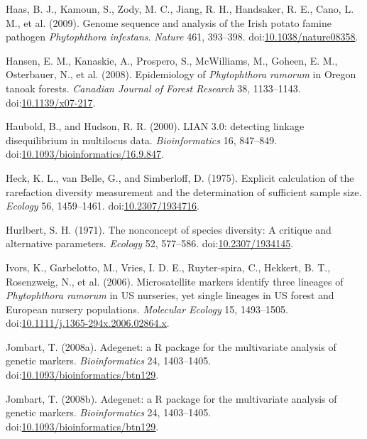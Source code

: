 \documentclass[double,12pt]{beavtex}
\begin{document}
  \hypertarget{ref-haas2009genome}{}
  Haas, B. J., Kamoun, S., Zody, M. C., Jiang, R. H., Handsaker, R. E.,
  Cano, L. M., et al. (2009). Genome sequence and analysis of the Irish
  potato famine pathogen \emph{Phytophthora infestans}. \emph{Nature} 461,
  393--398.
  doi:\href{https://doi.org/10.1038/nature08358}{10.1038/nature08358}.
  
  \hypertarget{ref-hansen2008epidemiology}{}
  Hansen, E. M., Kanaskie, A., Prospero, S., McWilliams, M., Goheen, E.
  M., Osterbauer, N., et al. (2008). Epidemiology of \emph{Phytophthora
  ramorum} in Oregon tanoak forests. \emph{Canadian Journal of Forest
  Research} 38, 1133--1143.
  doi:\href{https://doi.org/10.1139/x07-217}{10.1139/x07-217}.
  
  \hypertarget{ref-Haubold:2000}{}
  Haubold, B., and Hudson, R. R. (2000). LIAN 3.0: detecting linkage
  disequilibrium in multilocus data. \emph{Bioinformatics} 16, 847--849.
  doi:\href{https://doi.org/10.1093/bioinformatics/16.9.847}{10.1093/bioinformatics/16.9.847}.
  
  \hypertarget{ref-heck1975explicit}{}
  Heck, K. L., van Belle, G., and Simberloff, D. (1975). Explicit
  calculation of the rarefaction diversity measurement and the
  determination of sufficient sample size. \emph{Ecology} 56, 1459--1461.
  doi:\href{https://doi.org/10.2307/1934716}{10.2307/1934716}.
  
  \hypertarget{ref-hurlbert1971nonconcept}{}
  Hurlbert, S. H. (1971). The nonconcept of species diversity: A critique
  and alternative parameters. \emph{Ecology} 52, 577--586.
  doi:\href{https://doi.org/10.2307/1934145}{10.2307/1934145}.
  
  \hypertarget{ref-ivors2006microsatellite}{}
  Ivors, K., Garbelotto, M., Vries, I. D. E., Ruyter-spira, C., Hekkert,
  B. T., Rosenzweig, N., et al. (2006). Microsatellite markers identify
  three lineages of \emph{Phytophthora ramorum} in US nurseries, yet
  single lineages in US forest and European nursery populations.
  \emph{Molecular Ecology} 15, 1493--1505.
  doi:\href{https://doi.org/10.1111/j.1365-294x.2006.02864.x}{10.1111/j.1365-294x.2006.02864.x}.
  
  \hypertarget{ref-Jombart:2008}{}
  Jombart, T. (2008a). Adegenet: a R package for the multivariate analysis
  of genetic markers. \emph{Bioinformatics} 24, 1403--1405.
  doi:\href{https://doi.org/10.1093/bioinformatics/btn129}{10.1093/bioinformatics/btn129}.
  
  \hypertarget{ref-Jombart_2008}{}
  Jombart, T. (2008b). Adegenet: a R package for the multivariate analysis
  of genetic markers. \emph{Bioinformatics} 24, 1403--1405.
  doi:\href{https://doi.org/10.1093/bioinformatics/btn129}{10.1093/bioinformatics/btn129}.
  
\end{document}
